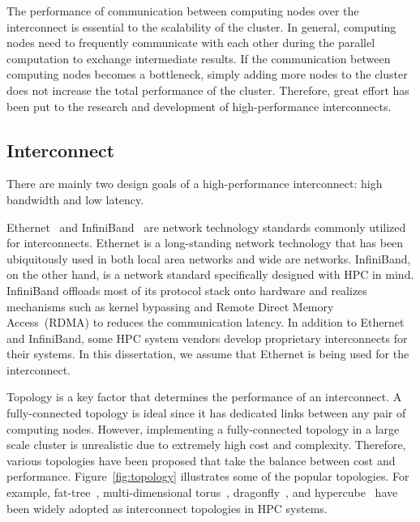 The performance of communication between computing nodes over the interconnect
is essential to the scalability of the cluster. In general, computing nodes
need to frequently communicate with each other during the parallel computation
to exchange intermediate results. If the communication between computing nodes
becomes a bottleneck, simply adding more nodes to the cluster does not
increase the total performance of the cluster. Therefore, great effort has
been put to the research and development of high-performance interconnects.

\subsection{Interconnect}\label{i-interconnect}

There are mainly two design goals of a high-performance interconnect: high
bandwidth and low latency.

Ethernet~\autocite{Trowbridge2007} and InfiniBand~\autocite{Buyya2001} are
network technology standards commonly utilized for interconnects. Ethernet is
a long-standing network technology that has been ubiquitously used in both
local area networks and wide are networks. InfiniBand, on the other hand, is a
network standard specifically designed with HPC in mind. InfiniBand offloads
most of its protocol stack onto hardware and realizes mechanisms such as
kernel bypassing and Remote Direct Memory Access~(RDMA) to reduces the
communication latency. In addition to Ethernet and InfiniBand, some HPC system
vendors develop proprietary interconnects for their systems. In this
dissertation, we assume that Ethernet is being used for the interconnect.

Topology is a key factor that determines the performance of an interconnect.
A fully-connected topology is ideal since it has dedicated links between any
pair of computing nodes. However, implementing a fully-connected topology in a
large scale cluster is unrealistic due to extremely high cost and complexity.
Therefore, various topologies have been proposed that take the balance
between cost and performance. Figure~\ref{fig:topology} illustrates some of
the popular topologies. For example, fat-tree~\autocite{Leiserson1985},
multi-dimensional torus~\autocite{Adiga2005,Ajima2012},
dragonfly~\autocite{Kim2008}, and hypercube~\autocite{Dally2003} have been
widely adopted as interconnect topologies in HPC systems.

